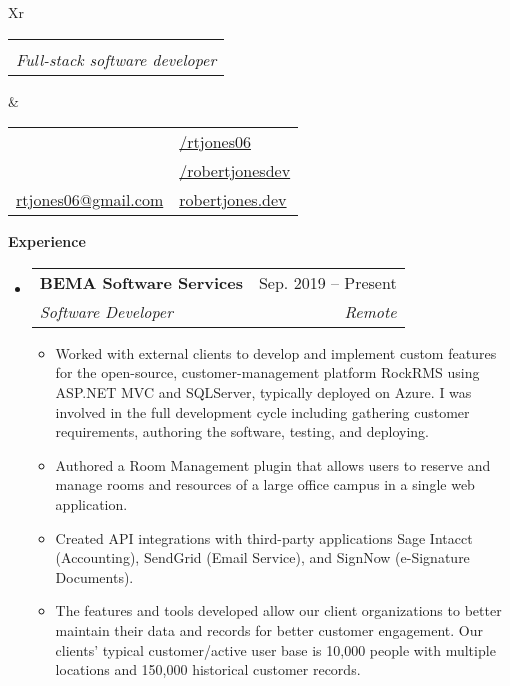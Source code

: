 \documentclass[letterpaper,11.5pt]{article}[leftmargin=*]
\makeatletter
\def \fullname {Robert Jones}
\def \subtitle {Full-stack software developer}
\def \locationicon {\faGlobe}
\def \locationtext {Salt Lake City, Utah}
\def \linkedinicon {\faLinkedin}
\def \linkedinlink {https://linkedin.com/in/rtjones06/}
\def \linkedintext {/rtjones06}
\def \phoneicon {\faPhone}
\def \phonetext {(xxx) xxx-4485}
\def \emailicon {\faEnvelope}
\def \emaillink {mailto:rtjones06@gmail.com}
\def \emailtext {rtjones06@gmail.com}
\def \githubicon {\faGithub}
\def \githublink {https://github.com/robertjonesdev}
\def \githubtext {/robertjonesdev}
\def \websiteicon {\faGlobe}
\def \websitelink {https://robertjones.dev/}
\def \websitetext {robertjones.dev}
\def \headertype {\doublecol} %
\def \entryspacing {-0pt}
\def \linkedin {\linkedinicon \hspace{3pt}\href{\linkedinlink}{\linkedintext}}
\def \phone {\phoneicon \hspace{3pt}{ \phonetext}}
\def \location {\locationicon \hspace{3pt}{ \locationtext }}
\def \email {\emailicon \hspace{3pt}\href{\emaillink}{\emailtext}}
\def \github {\githubicon \hspace{3pt}\href{\githublink}{\githubtext}}
\def \website {\websiteicon \hspace{3pt}\href{\websitelink}{\websitetext}}
\renewcommand{\section}[2]{\vspace{5pt}
  \colorbox{secondary}{\color{white}\raggedbottom\normalsize\textbf{{#1}{\hspace{7pt}#2}}}
}
\newcommand{\resumeEntryStart}{\begin{itemize}[leftmargin=2.5mm]}
\newcommand{\resumeEntryEnd}{\end{itemize}\vspace{\entryspacing}}
\newcommand{\resumeItemListStart}{\begin{itemize}[leftmargin=4.5mm]}
\newcommand{\resumeItemListEnd}{\end{itemize}}
\newcommand{\resumeItem}[1]{
  \item\small{
    {#1 \vspace{-2pt}}
  }
}
\newcommand{\resumeEntryTSDL}[4]{
  \vspace{-1pt}\item[]
    \begin{tabularx}{0.97\textwidth}{X@{\hspace{60pt}}r}
      \textbf{\color{primary}#1} & {\firabook\color{accent}\small#2} \\
      \textit{\color{accent}\small#3} & \textit{\color{accent}\small#4} \\
    \end{tabularx}\vspace{-6pt}
}
\newcommand{\resumeEntryS}[2]{
  \item[]\small{
    \textbf{\color{primary}#1 }{ #2 \vspace{-6pt}}
  }
}
\newcommand{\doublecol}[6]{
  \begin{tabularx}{\textwidth}{Xr}
    {
      \begin{tabular}[c]{l}
        \fontsize{35}{45}\selectfont{\color{primary}{{\textbf{\fullname}}}} \\
        {\textit{\subtitle}} %
      \end{tabular}
    } & {
      \begin{tabular}[c]{l@{\hspace{1.5em}}l}
        {\small#4} & {\small#1} \\
        {\small#5} & {\small#2} \\
        {\small#6} & {\small#3}
      \end{tabular}
    }
  \end{tabularx}
}
\newcommand{\singlecol}[6]{
  \begin{tabularx}{\textwidth}{Xr}
    {
      \begin{tabular}[b]{l}
        \fontsize{35}{45}\selectfont{\color{primary}{{\textbf{\fullname}}}} \\
        {\textit{\subtitle}} %
      \end{tabular}
    } & {
      \begin{tabular}[c]{l}
        {\small#1} \\
        {\small#2} \\
        {\small#3} \\
        {\small#4} \\
        {\small#5} \\
        {\small#6}
      \end{tabular}
    }
  \end{tabularx}
}
\makeatother
\begin{document}


\headertype{\linkedin}{\github}{\website}{\location}{\phone}{\email}{} %
\vspace{0pt} %


\section{\faPieChart}{Experience}

  \resumeEntryStart
    \resumeEntryTSDL
      {BEMA Software Services}{Sep. 2019 -- Present}
      {Software Developer}{Remote}
    \resumeItemListStart
      \resumeItem {Worked with external clients to develop and implement custom features for the open-source, customer-management platform RockRMS using ASP.NET MVC and SQLServer, typically deployed on Azure. I was involved in the full development cycle including gathering customer requirements, authoring the software, testing, and deploying.}
      \resumeItem {Authored a Room Management plugin that allows users to reserve and manage rooms and resources of a large office campus in a single web application.}
      \resumeItem {Created API integrations with third-party applications Sage Intacct (Accounting), SendGrid (Email Service), and SignNow (e-Signature Documents).}
      \resumeItem {The features and tools developed allow our client organizations to better maintain their data and records for better customer engagement. Our clients' typical customer/active user base is 10,000 people with multiple locations and 150,000 historical customer records.}
    \resumeItemListEnd
  \resumeEntryEnd
\end{document}
